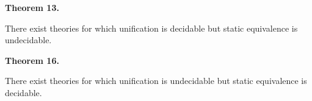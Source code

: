 \documentclass[10pt,a4paper]{amsart}
\begin{document}
 
 
 
 

 
\par\medskip\noindent\textbf{Theorem 13.}\par
 
 
There exist theories for which unification is decidable but static equivalence is undecidable.\par
 
 

 
\par\medskip\noindent\textbf{Theorem 16.}\par
 
 
There exist theories for which unification is undecidable but static equivalence is decidable.\par
 
 
\end{document}
